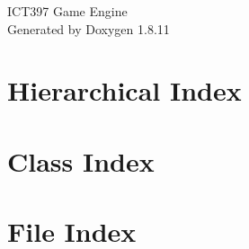 \documentclass[twoside]{book}
\newcommand{\+}{\discretionary{\mbox{\scriptsize$\hookleftarrow$}}{}{}}
\newcommand{\clearemptydoublepage}{%
  \newpage{\pagestyle{empty}\cleardoublepage}%
}
\begin{document}
\hypersetup{pageanchor=false,
             bookmarksnumbered=true,
             pdfencoding=unicode
            }
\begin{titlepage}
\vspace*{7cm}
\begin{center}%
{\Large I\+C\+T397 Game Engine }\\
\vspace*{1cm}
{\large Generated by Doxygen 1.8.11}\\
\end{center}
\end{titlepage}
\clearemptydoublepage
\tableofcontents
\clearemptydoublepage
{}
\hypersetup{pageanchor=true}

\chapter{Hierarchical Index}

\chapter{Class Index}

\chapter{File Index}

\end{document}
